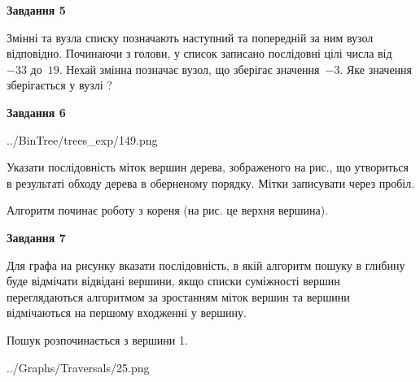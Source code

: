 \documentclass[12pt, ukrainian]{article}
\begin{document}
{\begin {large}
{\begin {center}\textbf{Завдання 5}\end {center}}\par
Змінні  та  вузла списку позначають наступний та попередній за ним вузол відповідно. Починаючи з голови, у список записано послідовні цілі числа від~$-33$ до~$19$. Нехай змінна  позначає вузол, що зберігає значення~$-3$.
Яке значення зберігається у вузлі  ?\par
\newpage

{\begin {center}\textbf{Завдання 6}\end {center}}\par

\begin{center}
	{../BinTree/trees_exp/149.png}
\end{center}
Указати послідовність міток вершин дерева, зображеного на рис., що утвориться в результаті обходу дерева в оберненому порядку. Мітки записувати через пробіл.\par Алгоритм починає роботу з кореня (на рис. це верхня вершина).\par
\newpage

{\begin {center}\textbf{Завдання 7}\end {center}}\par
Для графа на рисунку вказати послідовність, в якій алгоритм пошуку в глибину буде відмічати відвідані вершини, якщо списки суміжності вершин переглядаються алгоритмом за зростанням міток вершин та вершини відмічаються на першому вход\-женні у вершину.\par
Пошук розпочинається з вершини 1.\par

\begin{center}
	{../Graphs/Traversals/25.png}
\end{center}\par
\newpage


\end{large}}
\end{document}
